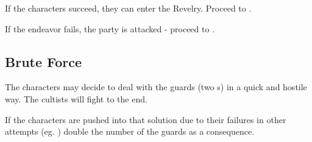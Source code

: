 \subsubsection{\pursuitResolveHeader}


If the characters succeed, they can enter the Revelry. Proceed to .

If the endeavor fails, the party is attacked - proceed to .





\subsection{Brute Force}
\label{ssec:cityEscapePlanForce}

The characters may decide to deal with the guards (two \enemyRevelerMasked{}s) in a quick and hostile way. The cultists will fight to the end.

If the characters are pushed into that solution due to their failures in other attempts (eg. ) double the number of the guards as a consequence.
